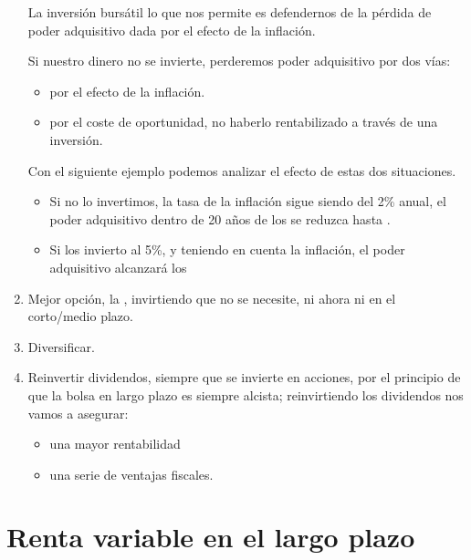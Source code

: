 \begin{enumerate}[label=\alph*)]
    La inversión bursátil lo que nos permite es defendernos de la pérdida de poder adquisitivo dada por el efecto de la inflación.

    Si nuestro dinero no se invierte, perderemos poder adquisitivo por dos vías:
    \begin{itemize}
        \item por el efecto de la inflación.
        \item por el coste de oportunidad, no haberlo rentabilizado a través de una inversión.
    \end{itemize}

    Con el siguiente ejemplo podemos analizar el efecto de estas dos situaciones.

    \begin{testexample}
        \begin{itemize}
            \item Si no lo invertimos, la tasa de la inflación sigue siendo del 2\% anual, el poder adquisitivo dentro de 20 años de los  se reduzca hasta .
            \item Si los invierto al 5\%, y teniendo en cuenta la inflación, el poder adquisitivo alcanzará los 
        \end{itemize}
    \end{testexample}
    
    \item Mejor opción, la , invirtiendo que no se necesite, ni ahora ni en el corto/medio plazo.
    \item Diversificar.
    \item Reinvertir dividendos, siempre que se invierte en acciones, por el principio de que la bolsa en largo plazo es siempre alcista; reinvirtiendo los dividendos nos vamos a asegurar:
    \begin{itemize}
        \item una mayor rentabilidad
        \item una serie de ventajas fiscales.
    \end{itemize}
\end{enumerate}

\section{Renta variable en el largo plazo}

